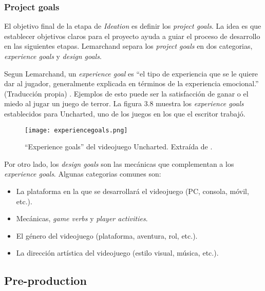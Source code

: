 \subsubsection{Project goals}
\par El objetivo final de la etapa de \textit{Ideation} es definir los \textit{project goals}. La idea es que establecer objetivos claros para el proyecto ayuda a guiar el proceso de desarrollo en las siguientes etapas. Lemarchand separa los \textit{project goals} en dos categorias, \textit{experience goals} y \textit{design goals}. 
\bigbreak
\par Segun Lemarchand, un \textit{experience goal} es ``el tipo de experiencia que se le quiere dar al jugador, generalmente explicada en términos de la experiencia emocional.'' (Traducción propia) \cite{lemarchandPlayfulProductionProcess2021}. Ejemplos de esto puede ser la satisfacción de ganar o el miedo al jugar un juego de terror. La figura 3.8 muestra los \textit{experience goals} establecidos para Uncharted, uno de los juegos en los que el escritor trabajó.
%
\begin{figure}[H]
    \centering
    \texttt{[image: experiencegoals.png]}
    \caption{``Experience goals'' del videojuego Uncharted. Extraída de \cite{lemarchandPlayfulProductionProcess2021}.}
    \label{fig:x ejemplo de experience goals Lemarchand}
\end{figure} 
%
\par Por otro lado, los \textit{design goals} son las mecánicas que complementan a los \textit{experience goals}. Algunas categorias comunes son:
\begin{itemize}
    \item La plataforma en la que se desarrollará el videojuego (PC, consola, móvil, etc.).
    \item Mecánicas, \textit{game verbs} y \textit{player activities}.
    \item El género del videojuego (plataforma, aventura, rol, etc.).
    \item La dirección artística del videojuego (estilo visual, música, etc.).
\end{itemize}
%
%
%
\subsection{Pre-production}


